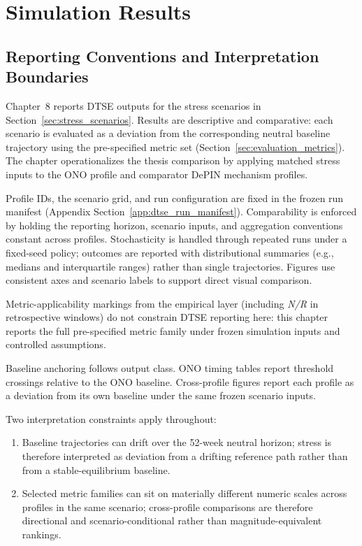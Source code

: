 \section{Simulation Results}
\label{sec:simulation_results}

\subsection{Reporting Conventions and Interpretation Boundaries}
\label{subsec:results_reporting_conventions}
Chapter~8 reports DTSE outputs for the stress scenarios in Section~\ref{sec:stress_scenarios}. Results are descriptive and comparative: each scenario is evaluated as a deviation from the corresponding neutral baseline trajectory using the pre-specified metric set (Section~\ref{sec:evaluation_metrics}). The chapter operationalizes the thesis comparison by applying matched stress inputs to the ONO profile and comparator DePIN mechanism profiles.

Profile IDs, the scenario grid, and run configuration are fixed in the frozen run manifest (Appendix Section~\ref{app:dtse_run_manifest}). Comparability is enforced by holding the reporting horizon, scenario inputs, and aggregation conventions constant across profiles. Stochasticity is handled through repeated runs under a fixed-seed policy; outcomes are reported with distributional summaries (e.g., medians and interquartile ranges) rather than single trajectories. Figures use consistent axes and scenario labels to support direct visual comparison.

Metric-applicability markings from the empirical layer (including \emph{N/R} in retrospective windows) do not constrain DTSE reporting here: this chapter reports the full pre-specified metric family under frozen simulation inputs and controlled assumptions.

Baseline anchoring follows output class. ONO timing tables report threshold crossings relative to the ONO baseline. Cross-profile figures report each profile as a deviation from its own baseline under the same frozen scenario inputs.

Two interpretation constraints apply throughout:
\begin{enumerate}
    \item Baseline trajectories can drift over the 52-week neutral horizon; stress is therefore interpreted as deviation from a drifting reference path rather than from a stable-equilibrium baseline.
    \item Selected metric families can sit on materially different numeric scales across profiles in the same scenario; cross-profile comparisons are therefore directional and scenario-conditional rather than magnitude-equivalent rankings.
\end{enumerate}

